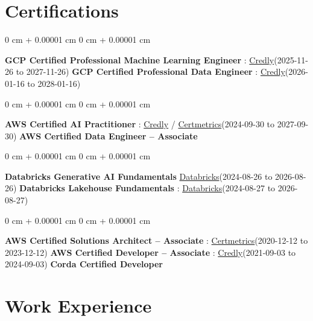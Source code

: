 \documentclass[10pt, letterpaper]{article}
\newenvironment{onecolentry}{
    \begin{adjustwidth}{
        0 cm + 0.00001 cm
    }{
        0 cm + 0.00001 cm
    }
}{
    \end{adjustwidth}
} %
\begin{document}
    \vspace{2 pt }
    \section{Certifications}
        \vspace{2 pt }
        \begin{samepage}
            \begin{onecolentry}
                \textbf{GCP Certified Professional Machine Learning Engineer} : \href{https://www.credly.com/badges/a6965347-09ea-4d8f-b398-0e151407160d/public_url}{Credly}(2025-11-26 to 2027-11-26) \quad
                \textbf{GCP Certified Professional Data Engineer} : \href{https://www.credly.com/badges/977e96d9-12e7-4f6c-b8a7-df71fb7153b8/public_url}{Credly}(2026-01-16 to 2028-01-16)
            \end{onecolentry}
            \begin{onecolentry}
                \textbf{AWS Certified AI Practitioner} : \href{https://www.credly.com/badges/451b7ba5-8be1-4a8e-bbec-ade26627a6b6/public_url}{Credly} / \href{https://cp.certmetrics.com/amazon/en/public/verify/credential/495f0d9853874bf9a33c17f8e89ce131}{Certmetrics}(2024-09-30 to 2027-09-30) \quad
                \textbf{AWS Certified Data Engineer – Associate}
            \end{onecolentry}
            \begin{onecolentry}
                \textbf{Databricks Generative AI Fundamentals} \href{https://sgq.io/3uIFGNi}{Databricks}(2024-08-26 to 2026-08-26) \quad
                \textbf{Databricks Lakehouse Fundamentals} : \href{https://scl.io/FXGKS0u}{Databricks}(2024-08-27 to 2026-08-27)
            \end{onecolentry}
            \begin{onecolentry}
                \textbf{AWS Certified Solutions Architect – Associate} : \href{https://cp.certmetrics.com/amazon/en/public/verify/credential/SNBY48EBJJVE1SWX}{Certmetrics}(2020-12-12 to 2023-12-12) \quad
                \textbf{AWS Certified Developer – Associate} : \href{https://www.credly.com/badges/b8106fbd-d3d1-4204-8cdf-e708798fd582/public_url}{Credly}(2021-09-03 to 2024-09-03) \quad
                \textbf{Corda Certified Developer}
            \end{onecolentry}
        \end{samepage}


    \vspace{2 pt }
    \section{Work Experience}
        \vspace{0.1cm}
\end{document}
